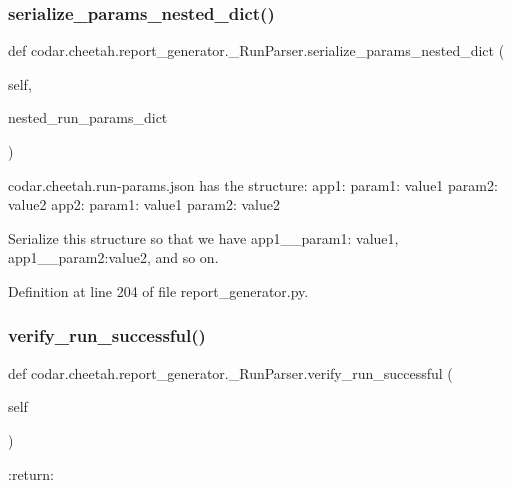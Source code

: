 \subsubsection{\texorpdfstring{serialize\+\_\+params\+\_\+nested\+\_\+dict()}{serialize\_params\_nested\_dict()}}
{\footnotesize\ttfamily def codar.\+cheetah.\+report\+\_\+generator.\+\_\+\+Run\+Parser.\+serialize\+\_\+params\+\_\+nested\+\_\+dict (\begin{DoxyParamCaption}\item[{}]{self,  }\item[{}]{nested\+\_\+run\+\_\+params\+\_\+dict }\end{DoxyParamCaption})}

\begin{DoxyVerb}codar.cheetah.run-params.json has the structure:
{
    app1: {
param1: value1
param2: value2
    }
    app2: {
param1: value1
param2: value2
    }
}

Serialize this structure so that we have
{app1__param1: value1, app1__param2:value2, and so on}.
\end{DoxyVerb}
 

Definition at line 204 of file report\+\_\+generator.\+py.

\mbox{\label{classcodar_1_1cheetah_1_1report__generator_1_1___run_parser_a7903f37cfae3abbf922c55e83b214567}} 
\subsubsection{\texorpdfstring{verify\+\_\+run\+\_\+successful()}{verify\_run\_successful()}}
{\footnotesize\ttfamily def codar.\+cheetah.\+report\+\_\+generator.\+\_\+\+Run\+Parser.\+verify\+\_\+run\+\_\+successful (\begin{DoxyParamCaption}\item[{}]{self }\end{DoxyParamCaption})}

\begin{DoxyVerb}:return:
\end{DoxyVerb}
 

